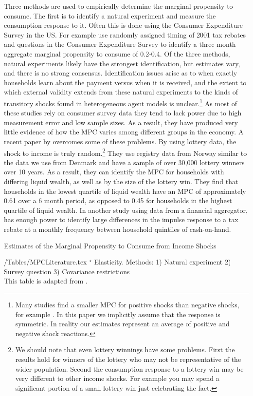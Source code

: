 \documentclass[titlepage]{\econtex}\newcommand{\texname}{ConsumptionHeterogeneity}
\begin{document}
Three methods are used to empirically determine the marginal propensity to consume. The first is to identify a natural experiment and measure the consumption response to it. Often this is done using the Consumer Expenditure Survey in the US. For example \cite{johnson_household_2006} use randomly assigned timing of 2001 tax rebates and questions in the Consumer Expenditure Survey to identify a three month aggregate marginal propensity to consume of 0.2-0.4. Of the three methods, natural experiments likely have the strongest identification, but estimates vary, and there is no strong consensus. Identification issues arise as to when exactly households learn about the payment versus when it is received, and the extent to which external validity extends from these natural experiments to the kinds of transitory shocks found in heterogeneous agent models is unclear.\footnote{Many studies find a smaller MPC for positive shocks than negative shocks, for example \cite{bunn_consumption_2018}. In this paper we implicitly assume that the response is symmetric. In reality our estimates represent an average of positive and negative shock reactions.} As most of these studies rely on consumer survey data they tend to lack power due to high measurement error and low sample sizes. As a result, they have produced very little evidence of how the MPC varies among different groups in the economy. A recent paper by \cite{fagereng_mpc_2016} overcomes some of these problems. By using lottery data, the shock to income is truly random.\footnote{We should note that even lottery winnings have some problems. First the results hold for winners of the lottery who may not be representative of the wider population. Second the consumption response to a lottery win may be very different to other income shocks. For example you may spend a significant portion of a small lottery win just celebrating the fact.} They use registry data from Norway similar to the data we use from Denmark and have a sample of over 30,000 lottery winners over 10 years. As a result, they can identify the MPC for households with differing liquid wealth, as well as by the size of the lottery win. They find that households in the lowest quartile of liquid wealth have an MPC of approximately 0.61 over a 6 month period, as opposed to 0.45 for households in the highest quartile of liquid wealth. In another study using data from a financial aggregator, \cite{gelman_what_2016} has enough power to identify large differences in the impulse response to a tax rebate at a monthly frequency between household quintiles of cash-on-hand.
\begin{sidewaystable} \small
	\caption{Estimates of the Marginal Propensity to Consume from Income Shocks}
	\label{table:MPCLiterature}
	\begin{minipage}{\textwidth}
		\econtexRoot/Tables/MPCLiterature.tex 
		\footnotesize{$^{\star}$ Elasticity. Methods: 1) Natural experiment 2) Survey question 3) Covariance restrictions \\
		This table is adapted from \cite{carroll_distribution_2017}.}
	\end{minipage}
\end{sidewaystable}
\end{document}
